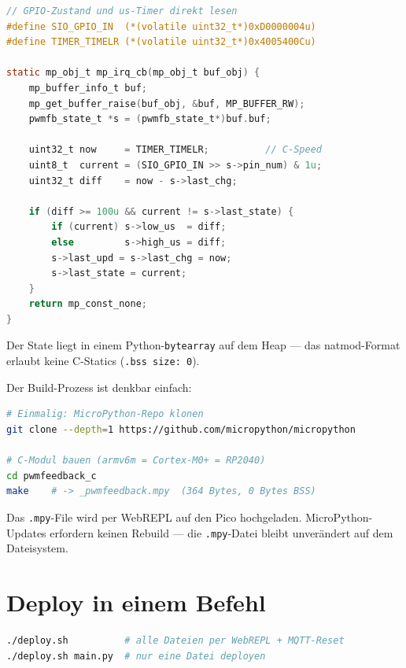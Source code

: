 \documentclass[11pt,a4paper]{article}
\begin{document}
\begin{lstlisting}[language=C, caption={Direkter RP2040-Registerzugriff}]
// GPIO-Zustand und us-Timer direkt lesen
#define SIO_GPIO_IN  (*(volatile uint32_t*)0xD0000004u)
#define TIMER_TIMELR (*(volatile uint32_t*)0x4005400Cu)

static mp_obj_t mp_irq_cb(mp_obj_t buf_obj) {
    mp_buffer_info_t buf;
    mp_get_buffer_raise(buf_obj, &buf, MP_BUFFER_RW);
    pwmfb_state_t *s = (pwmfb_state_t*)buf.buf;

    uint32_t now     = TIMER_TIMELR;          // C-Speed
    uint8_t  current = (SIO_GPIO_IN >> s->pin_num) & 1u;
    uint32_t diff    = now - s->last_chg;

    if (diff >= 100u && current != s->last_state) {
        if (current) s->low_us  = diff;
        else         s->high_us = diff;
        s->last_upd = s->last_chg = now;
        s->last_state = current;
    }
    return mp_const_none;
}
\end{lstlisting}

Der State liegt in einem Python-\texttt{bytearray} auf dem Heap ---
das natmod-Format erlaubt keine C-Statics (\texttt{.bss size: 0}).

Der Build-Prozess ist denkbar einfach:

\begin{lstlisting}[language=bash, caption={Natmod kompilieren}]
# Einmalig: MicroPython-Repo klonen
git clone --depth=1 https://github.com/micropython/micropython

# C-Modul bauen (armv6m = Cortex-M0+ = RP2040)
cd pwmfeedback_c
make    # -> _pwmfeedback.mpy  (364 Bytes, 0 Bytes BSS)
\end{lstlisting}

Das \texttt{.mpy}-File wird per WebREPL auf den Pico hochgeladen.
MicroPython-Updates erfordern keinen Rebuild --- die \texttt{.mpy}-Datei
bleibt unverändert auf dem Dateisystem.

\section{Deploy in einem Befehl}

\begin{lstlisting}[language=bash, caption={deploy.sh}]
./deploy.sh          # alle Dateien per WebREPL + MQTT-Reset
./deploy.sh main.py  # nur eine Datei deployen
\end{lstlisting}
\end{document}
